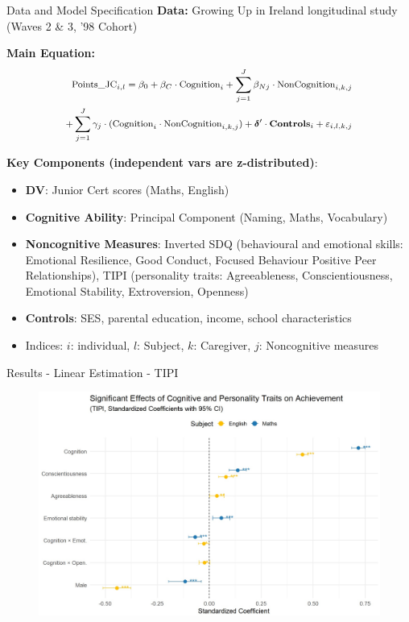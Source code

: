 \documentclass{beamer}
\begin{document}
\begin{frame}{Data and Model Specification}
\hypertarget{Data and Model Specification}{}
\footnotesize
\textbf{Data:} Growing Up in Ireland longitudinal study (Waves 2 \& 3, '98 Cohort) 

\vspace{0.2cm}

\textbf{Main Equation:}
\begin{equation*}
\footnotesize
\begin{split}
\text{Points\_JC}_{i,l} = \beta_0 + \beta_C \cdot \text{Cognition}_{i} 
+ \sum_{j=1}^{J} \beta_{Nj} \cdot \text{NonCognition}_{i,k,j} \\
+ \sum_{j=1}^{J} \gamma_j \cdot (\text{Cognition}_{i} \cdot \text{NonCognition}_{i,k,j}) 
+ \boldsymbol{\delta}' \cdot \mathbf{Controls}_{i} + \varepsilon_{i,l,k,j}
\end{split}
\end{equation*}


\vspace{0.2cm}

\textbf{Key Components (independent vars are z-distributed)}:
\begin{itemize}
    \item \textbf{DV}: Junior Cert scores (Maths, English)
    \item \textbf{Cognitive Ability}: Principal Component (Naming, Maths, Vocabulary)
    \item \textbf{Noncognitive Measures}: Inverted SDQ (behavioural and emotional skills: Emotional Resilience, Good Conduct, Focused Behaviour Positive Peer Relationships), TIPI (personality traits: Agreeableness, Conscientiousness, Emotional Stability, Extroversion, Openness)
    \item \textbf{Controls}: SES, parental education, income, school characteristics
    \item Indices: $i$: individual, $l$: Subject, $k$: Caregiver, $j$: Noncognitive measures
\end{itemize}
\end{frame}


\begin{frame}{Results - Linear Estimation - TIPI}
\begin{figure}[h!]
    \centering
    \includegraphics[width=0.9\linewidth]{TIPI_Linear_Estimates.JPG}
\end{figure}
\end{frame}
\end{document}
